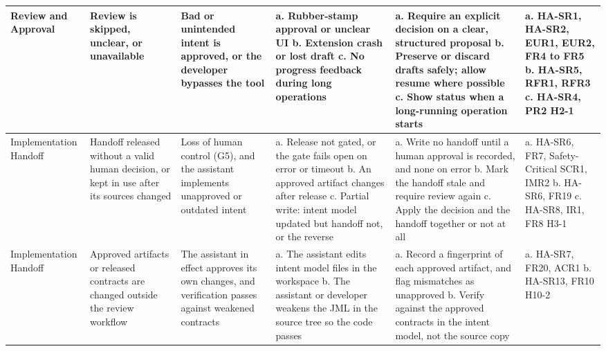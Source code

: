\documentclass{article}
\begin{document}
\begin{landscape}
\begin{small}
\begin{longtable}{|p{2.1cm}|p{2.4cm}|p{2.8cm}|p{3.2cm}|p{3.6cm}|p{2.4cm}|}
Review and Approval &
Review is skipped, unclear, or unavailable &
Bad or unintended intent is approved, or the developer bypasses the tool &
a. Rubber-stamp approval or unclear UI\newline
b. Extension crash or lost draft\newline
c. No progress feedback during long operations &
a. Require an explicit decision on a clear, structured proposal\newline
b. Preserve or discard drafts safely; allow resume where possible\newline
c. Show status when a long-running operation starts &
a. HA-SR1, HA-SR2, EUR1, EUR2, FR4 to FR5\newline
b. HA-SR5, RFR1, RFR3\newline
c. HA-SR4, PR2\newline
H2-1 \\
\hline

\hspace{0pt}Implementation Handoff &

Handoff released without a valid human decision, or kept in use after its
sources changed &
Loss of human control (G5), and the assistant implements unapproved or
outdated intent &
a. Release not gated, or the gate fails open on error or timeout\newline
b. An approved artifact changes after release\newline
c. Partial write: intent model updated but handoff not, or the reverse &
a. Write no handoff until a human approval is recorded, and none on
error\newline
b. Mark the handoff stale and require review again\newline
c. Apply the decision and the handoff together or not at all &
a. HA-SR6, FR7, Safety-Critical SCR1, IMR2\newline
b. HA-SR6, FR19\newline
c. HA-SR8, IR1, FR8\newline
H3-1 \\
\hline

\hspace{0pt}Implementation Handoff &

Approved artifacts or released contracts are changed outside the review
workflow &
The assistant in effect approves its own changes, and verification passes
against weakened contracts &
a. The assistant edits intent model files in the workspace\newline
b. The assistant or developer weakens the JML in the source tree so the code
passes &
a. Record a fingerprint of each approved artifact, and flag mismatches as
unapproved\newline
b. Verify against the approved contracts in the intent model, not the source
copy &
a. HA-SR7, FR20, ACR1\newline
b. HA-SR13, FR10\newline
H10-2 \\
\hline


\end{longtable}
\end{small}
\end{landscape}
\end{document}
